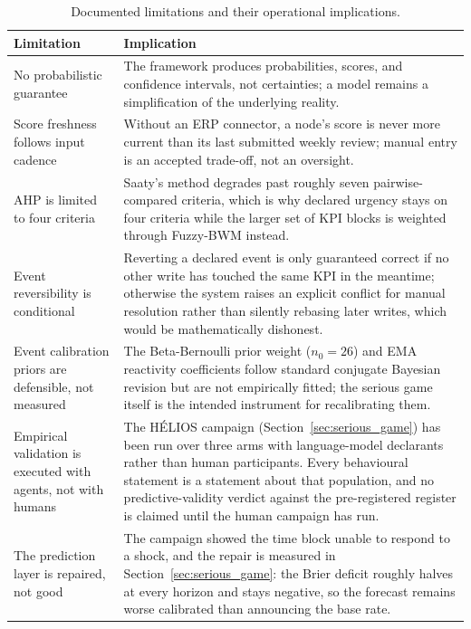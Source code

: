 \begin{table}[H]
\centering
\caption{Documented limitations and their operational implications.}
\label{tab:limitations}
\small
\begin{tabularx}{\linewidth}{>{\raggedright\arraybackslash}p{4.2cm} X}
\toprule
\textbf{Limitation} & \textbf{Implication} \\
\midrule
No probabilistic guarantee & The framework produces probabilities, scores, and confidence intervals, not certainties; a model remains a simplification of the underlying reality. \\[3pt]
\midrule
Score freshness follows input cadence & Without an ERP connector, a node's score is never more current than its last submitted weekly review; manual entry is an accepted trade-off, not an oversight. \\[3pt]
\midrule
AHP is limited to four criteria & Saaty's method degrades past roughly seven pairwise-compared criteria, which is why declared urgency stays on four criteria while the larger set of KPI blocks is weighted through Fuzzy-BWM instead. \\[3pt]
\midrule
Event reversibility is conditional & Reverting a declared event is only guaranteed correct if no other write has touched the same KPI in the meantime; otherwise the system raises an explicit conflict for manual resolution rather than silently rebasing later writes, which would be mathematically dishonest. \\[3pt]
\midrule
Event calibration priors are defensible, not measured & The Beta-Bernoulli prior weight ($n_0=26$) and EMA reactivity coefficients follow standard conjugate Bayesian revision but are not empirically fitted; the serious game itself is the intended instrument for recalibrating them. \\[3pt]
\midrule
Empirical validation is executed with agents, not with humans & The HÉLIOS campaign (Section~\ref{sec:serious_game}) has been run over three arms with language-model declarants rather than human participants. Every behavioural statement is a statement about that population, and no predictive-validity verdict against the pre-registered register is claimed until the human campaign has run. \\[3pt]
\midrule
The prediction layer is repaired, not good & The campaign showed the time block unable to respond to a shock, and the repair is measured in Section~\ref{sec:serious_game}: the Brier deficit roughly halves at every horizon and stays negative, so the forecast remains worse calibrated than announcing the base rate. \\[3pt]

\end{tabularx}
\end{table}
